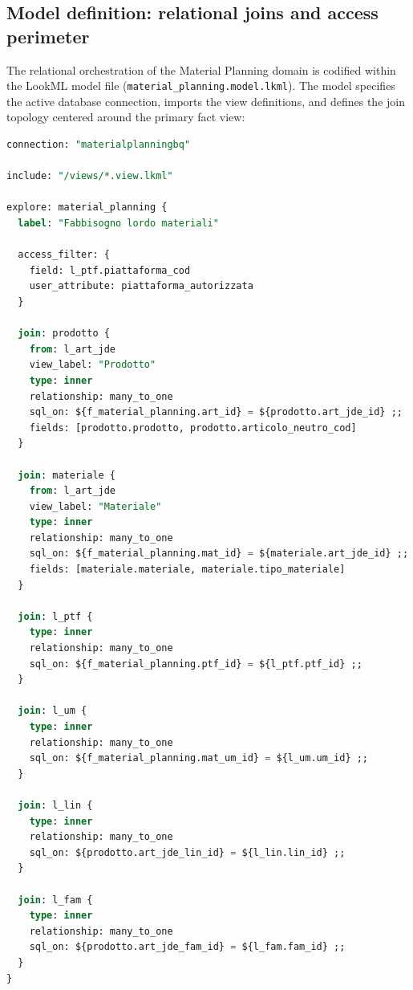 \subsection{Model definition: relational joins and access perimeter}
The relational orchestration of the Material Planning domain is codified within the LookML model file (\texttt{material\_planning.model.lkml}). The model specifies the active database connection, imports the view definitions, and defines the join topology centered around the primary fact view:

\begin{lstlisting}[language=SQL, basicstyle=\footnotesize\ttfamily, caption={LookML Model and Explore configuration for Material Planning (simplified excerpt)}, label={lst:lookml_model}]
connection: "materialplanningbq"

include: "/views/*.view.lkml"

explore: material_planning {
  label: "Fabbisogno lordo materiali"

  access_filter: {
    field: l_ptf.piattaforma_cod
    user_attribute: piattaforma_autorizzata
  }

  join: prodotto {
    from: l_art_jde
    view_label: "Prodotto"
    type: inner
    relationship: many_to_one
    sql_on: ${f_material_planning.art_id} = ${prodotto.art_jde_id} ;;
    fields: [prodotto.prodotto, prodotto.articolo_neutro_cod]
  }

  join: materiale {
    from: l_art_jde
    view_label: "Materiale"
    type: inner
    relationship: many_to_one
    sql_on: ${f_material_planning.mat_id} = ${materiale.art_jde_id} ;;
    fields: [materiale.materiale, materiale.tipo_materiale]
  }

  join: l_ptf {
    type: inner
    relationship: many_to_one
    sql_on: ${f_material_planning.ptf_id} = ${l_ptf.ptf_id} ;;
  }

  join: l_um {
    type: inner
    relationship: many_to_one
    sql_on: ${f_material_planning.mat_um_id} = ${l_um.um_id} ;;
  }

  join: l_lin {
    type: inner
    relationship: many_to_one
    sql_on: ${prodotto.art_jde_lin_id} = ${l_lin.lin_id} ;;
  }

  join: l_fam {
    type: inner
    relationship: many_to_one
    sql_on: ${prodotto.art_jde_fam_id} = ${l_fam.fam_id} ;;
  }
}
\end{lstlisting}


